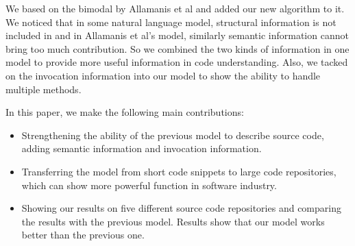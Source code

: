 We based on the bimodal by Allamanis et al\cite{allamanis2015bimodal} and added our new algorithm to it.
We noticed that in some natural language model, structural information is not included in and in Allamanis et al's
model, similarly semantic information cannot bring too much contribution. So we combined the two kinds of
information in one model to provide more useful information in code understanding. Also, we tacked on the
invocation information into our model to show the ability to handle multiple methods.

In this paper, we make the following main contributions:
\begin{itemize}
\item Strengthening the ability of the previous model to describe source code, adding semantic information
and invocation information.
\item Transferring the model from short code snippets to large code repositories, which can show more powerful
function in software industry.
\item Showing our results on five different source code repositories and comparing the results with the
previous model. Results show that our model works better than the previous one.
\end{itemize}
